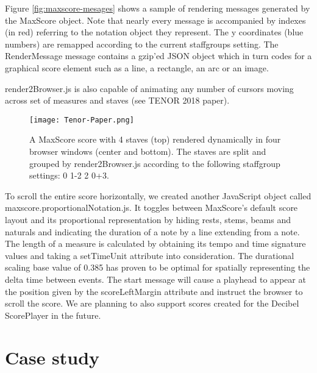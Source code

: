Figure \ref{fig:maxscore-mesages} shows a sample of rendering messages generated by the MaxScore object. Note that nearly every message is accompanied by indexes (in red) referring to the notation object they represent. The y coordinates (blue numbers) are remapped according to the current staffgroups setting. The RenderMessage message contains a gzip’ed JSON object which in turn codes for a graphical score element such as a line, a rectangle, an arc or an image.

render2Browser.js is also capable of animating any number of cursors moving across set of measures and staves (see TENOR 2018 paper).

\begin{figure*}[h]
    \centering
    \begin{minipage}{1.\textwidth}
        \centering
        \texttt{[image: Tenor-Paper.png]} 
       	\caption{A MaxScore score with 4 staves (top) rendered dynamically in four browser windows (center and bottom). The staves are split and grouped by render2Browser.js according to the following staffgroup settings: 0 1-2 2 0+3.
\label{fig:Tenor-Paper}}
    \end{minipage}
\end{figure*}


To scroll the entire score horizontally, we created another JavaScript object called maxscore.proportionalNotation.js. It toggles between MaxScore’s default score layout and its proportional representation by hiding rests, stems, beams and naturals and indicating the duration of a note by a line extending from a note. The length of a measure is calculated by obtaining its tempo and time signature values and taking a setTimeUnit attribute into consideration. The durational scaling base value of 0.385 has proven to be optimal for spatially representing the delta time between events. The start message will cause a playhead to appear at the position given by the scoreLeftMargin attribute and instruct the browser to scroll the score. We are planning to also support scores created for the Decibel ScorePlayer in the future. 







\section{Case study}

